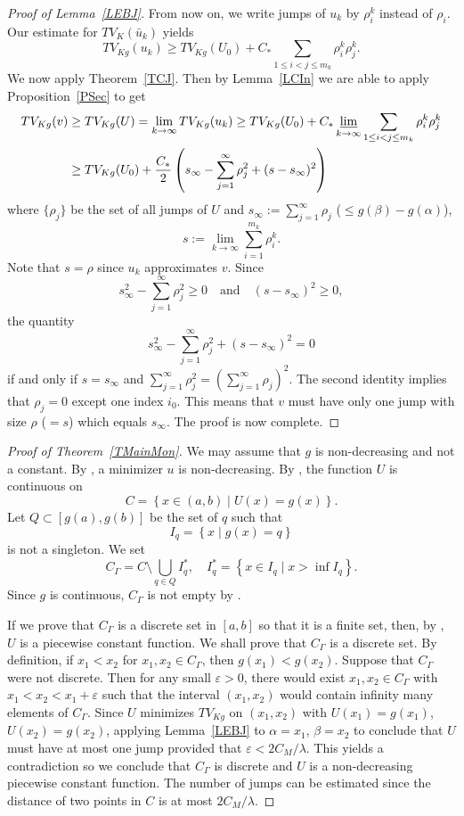 \documentclass[12pt, reqno]{amsart}
\numberwithin{equation}{section}
\begin{document}
\begin{proof}[Proof of Lemma~\ref{LEBJ}]
From now on, we write jumps of $u_k$ by $\rho_i^k$ instead of $\rho_i$.
 Our estimate for $TV_K(\bar{u}_k)$ yields
\[
	TV_{Kg}(u_k) \geq TV_{Kg}(U_0) + C_* \sum_{1\leq i<j\leq m_k}\rho_i^k \rho_j^k.
\]
We now apply Theorem~\ref{TCJ}.
 Then by Lemma~\ref{LCIn} we are able to apply Proposition~\ref{PSec} to get
\begin{align*}
	TV_{Kg}(v) &\geq TV_{Kg}(U)
    = \lim_{k\to\infty} TV_{Kg}(u_k) \ge TV_{Kg}(U_0)
    + C_* \varliminf_{k\to\infty} \sum_{1\le i<j\le m_k} \rho_i^k \rho_j^k \\
    &\ge TV_{Kg}(U_0) + \frac{C_*}{2} \left(s_\infty - \sum_{j=1}^\infty \rho_j^2 + (s-s_\infty)^2 \right)
\end{align*}
where $\{\rho_j\}$ be the set of all jumps of $U$ and $s_\infty:=\sum_{j=1}^\infty\rho_j$ ($\le g(\beta)-g(\alpha)$),
\[
    s := \lim_{k\to\infty} \sum_{i=1}^{m_k}\rho_i^k.
\]
Note that $s=\rho$ since $u_k$ approximates $v$.
 Since
\[
    s_\infty^2 - \sum_{j=1}^\infty \rho_j^2 \ge 0
    \quad\text{and}\quad(s-s_\infty)^2 \ge 0,
\]
the quantity
\[
    s_\infty^2 - \sum_{j=1}^\infty \rho_j^2 + (s-s_\infty)^2 = 0
\]
if and only if $s=s_\infty$ and $\sum_{j=1}^\infty \rho_j^2=\left(\sum_{j=1}^\infty \rho_j\right)^2$.
 The second identity implies that $\rho_j=0$ except one index $i_0$.
 This means that $v$ must have only one jump with size $\rho$ ($=s$) which equals $s_\infty$.
 The proof is now complete.
\end{proof}
%
\begin{proof}[Proof of Theorem~\ref{TMainMon}]
We may assume that $g$ is non-decreasing and not a constant.
 By \cite[Lemma 4.12]{GKKOS}, a minimizer $u$ is non-decreasing.
 By \cite[Lemma 3.2]{GKKOS}, the function $U$ is continuous on
\[ 
    C=\left\{x\in(a,b)\mid U(x)=g(x)\right\}.
\]
 Let $Q\subset\left[g(a),g(b)\right]$ be the set of $q$ such that
\[
    I_q = \left\{ x \mid g(x) = q \right\}
\]
is not a singleton.
 We set
\[
    C_\Gamma = C \setminus \bigcup_{q\in Q} I_q^*, \quad
    I_q^* = \left\{ x \in I_q \mid x> \inf I_q \right\}.
\]
Since $g$ is continuous, $C_\Gamma$ is not empty by \cite[Lemma 3.1]{GKKOS}.

If we prove that $C_\Gamma$ is a discrete set in $[a,b]$ so that it is a finite set, then, by \cite[Lemma 3.1]{GKKOS}, $U$ is a piecewise constant function.
 We shall prove that $C_\Gamma$ is a discrete set.
 By definition, if $x_1<x_2$ for $x_1,x_2\in C_\Gamma$, then $g(x_1)<g(x_2)$.
 Suppose that $C_\Gamma$ were not discrete.
 Then for any small $\varepsilon>0$, there would exist $x_1,x_2\in C_\Gamma$ with $x_1<x_2<x_1+\varepsilon$ such that the interval $(x_1,x_2)$ would contain infinity many elements of $C_\Gamma$.
 Since $U$ minimizes $TV_{Kg}$ on $(x_1,x_2)$ with $U(x_1)=g(x_1)$, $U(x_2)=g(x_2)$, applying Lemma~\ref{LEBJ} to $\alpha=x_1$, $\beta=x_2$ to conclude that $U$ must have at most one jump provided that $\varepsilon<2C_M/\lambda$.
 This yields a contradiction so we conclude that $C_\Gamma$ is discrete and $U$ is a non-decreasing piecewise constant function.
 The number of jumps can be estimated since the distance of two points in $C$ is at most $2C_M/\lambda$.
\end{proof}
\end{document}
